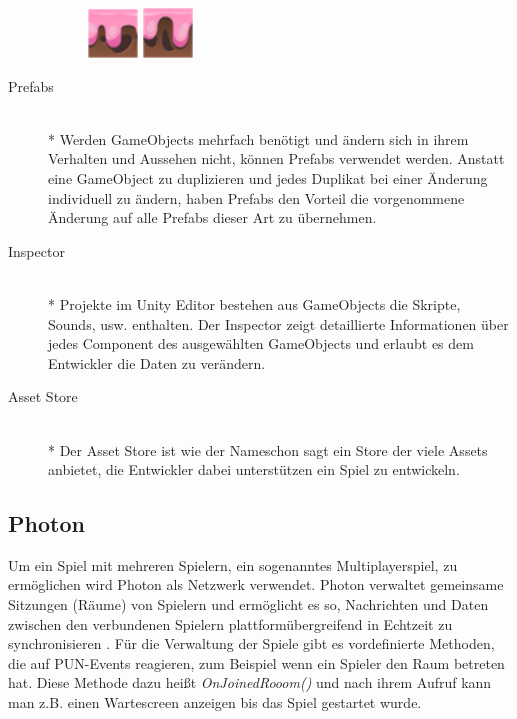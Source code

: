 \begin{description}
\begin{figure}[H]
\begin{center}
              \includegraphics[width=50px]{img/realisierung/tile2.png}
              \includegraphics[width=50px]{img/realisierung/tile3.png}
              \label{fig:realisierung:realisierung:tiles}
            \end{center}
        \end{figure}
        
    \item[Prefabs] \hfill \\* Werden GameObjects mehrfach benötigt und ändern sich in ihrem Verhalten und Aussehen nicht, können Prefabs verwendet werden. Anstatt eine GameObject zu duplizieren und jedes Duplikat bei einer Änderung individuell zu ändern, haben Prefabs den Vorteil die vorgenommene Änderung auf alle Prefabs dieser Art zu übernehmen.
    \item[Inspector] \hfill \\* Projekte im Unity Editor bestehen aus GameObjects die Skripte, Sounds, usw. enthalten. Der Inspector zeigt detaillierte Informationen über jedes Component des ausgewählten GameObjects und erlaubt es dem Entwickler die Daten zu verändern.
    \item[Asset Store] \hfill \\* Der Asset Store ist wie der Nameschon sagt ein Store der viele Assets anbietet, die Entwickler dabei unterstützen ein Spiel zu entwickeln.
\end{description}


\subsection{Photon}
\label{subsec:realisierung:technologien:photon}
Um ein Spiel mit mehreren Spielern, ein sogenanntes Multiplayerspiel, zu ermöglichen wird Photon als Netzwerk verwendet. Photon verwaltet gemeinsame Sitzungen (Räume) von Spielern und ermöglicht es so, Nachrichten und Daten zwischen den verbundenen Spielern plattformübergreifend in Echtzeit zu synchronisieren \cite{photon}. Für die Verwaltung der Spiele gibt es vordefinierte Methoden, die auf PUN-Events reagieren, zum Beispiel wenn ein Spieler den Raum betreten hat. Diese Methode dazu heißt \textit{OnJoinedRooom()} und nach ihrem Aufruf kann man z.B. einen Wartescreen anzeigen bis das Spiel gestartet wurde.

